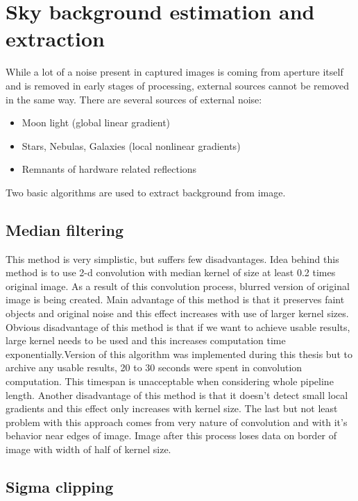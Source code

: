 \documentclass[12pt, a4paper, oneside]{book}
\begin{document}
\section{Sky background estimation and extraction}
While a lot of a noise present in captured images is coming from aperture itself and is removed in early stages of processing, external sources cannot be removed in the same way.
There are several sources of external noise:
\begin{itemize}
    \item{Moon light (global linear gradient)}
    \item{Stars, Nebulas, Galaxies (local nonlinear gradients)}
    \item{Remnants of hardware related reflections}
\end{itemize}
Two basic algorithms are used to extract background from image.

\subsection{Median filtering}

This method is very simplistic, but suffers few disadvantages.
Idea behind this method is to use 2-d convolution with median kernel of size at least 0.2 times original image.
As a result of this convolution process, blurred version of original image is being created.
Main advantage of this method is that it preserves faint objects and original noise and this effect increases with use of larger kernel sizes.
Obvious disadvantage of this method is that if we want to achieve usable results, large kernel needs to be used and this increases computation time exponentially.Version of this algorithm was implemented during this thesis but to archive any usable results, 20 to 30 seconds were spent in convolution computation.
This timespan is unacceptable when considering whole pipeline length.
Another disadvantage of this method is that it doesn't detect small local gradients and this effect only increases with kernel size.
The last but not least problem with this approach comes from very nature of convolution and with it's behavior near edges of image.
Image after this process loses data on border of image with width of half of kernel size.

\subsection{Sigma clipping}
\end{document}
